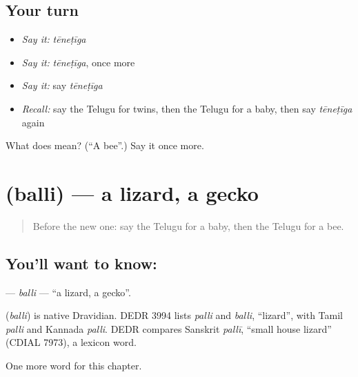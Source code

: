 \subsection*{Your turn}
\begin{itemize}
\raggedright
  \item \emph{Say it:} \emph{tēneṭīga}
  \item \emph{Say it:} \emph{tēneṭīga}, once more
  \item \emph{Say it:} say \emph{tēneṭīga}
  \item \emph{Recall:} say the Telugu for twins, then the Telugu for a baby, then say \emph{tēneṭīga} again
\end{itemize}

\begin{tcolorbox}[breakable,colback=teal!4,colframe=teal!35!black,title={Before you move on}]
What does  mean? (\textquotedblleft{}A bee\textquotedblright{}.) Say it once more.
\end{tcolorbox}
\section[\texorpdfstring{\te{బల్లి} (balli)}{బల్లి (balli)}]{ (balli) — a lizard, a gecko}

\label{lesson:TE-C187-balli}



\begin{quote}
Before the new one: say the Telugu for a baby, then the Telugu for a bee.
\end{quote}

\subsection*{You'll want to know: }
\textbf{} — \emph{balli} — \textquotedblleft{}a lizard, a gecko\textquotedblright{}.

\begin{cousinweb}
\textbf{} (\emph{balli}) is native Dravidian. DEDR 3994 lists \emph{palli} and \emph{balli}, \textquotedblleft{}lizard\textquotedblright{}, with Tamil \emph{palli} and Kannada \emph{palli}. DEDR compares Sanskrit \emph{pallī}, \textquotedblleft{}small house lizard\textquotedblright{} (CDIAL 7973), a lexicon word.
\end{cousinweb}

\begin{grammarlens}[title={What you've built}]
One more word for this chapter.
\end{grammarlens}

